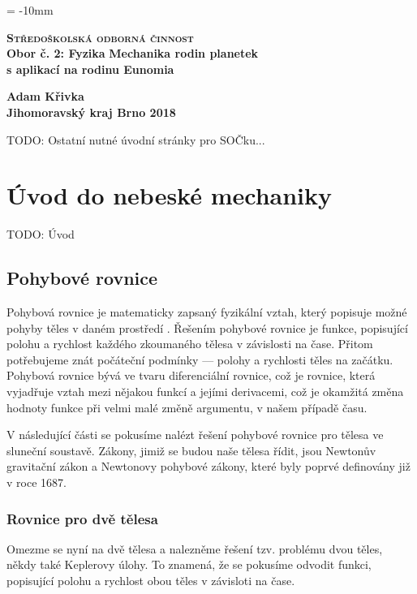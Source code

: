 \documentclass[A4paper, 12pt, oneside]{book}
\newcommand{\B}[1]{\textbf{#1}}
\renewcommand{\S}[1]{\textsc{#1}}
\begin{document}
\voffset = -10mm
\begin{center}
	{\LARGE \B{\S{Středoškolská odborná činnost}}} \\
	{\large \B{{Obor č. 2: Fyzika}}}
	\vfill
	{\Huge \B{Mechanika rodin planetek \\ s aplikací na rodinu Eunomia}}
\end{center}
	\vfill
{\large \bfseries Adam Křivka \\
	Jihomoravský kraj \hfill Brno 2018}

\newpage

TODO: Ostatní nutné úvodní stránky pro SOČku...

\newpage
\tableofcontents
\newpage

\chapter{Úvod do nebeské mechaniky}
TODO: Úvod
\vspace{40mm}
\section{Pohybové rovnice}
Pohybová rovnice je matematicky zapsaný fyzikální vztah, který popisuje možné pohyby těles v daném prostředí \autocite{wiki:eqm}. Řešením pohybové rovnice je funkce, popisující polohu a rychlost každého zkoumaného tělesa v závislosti na čase. Přitom potřebujeme znát počáteční podmínky --- polohy a rychlosti těles na začátku. Pohybová rovnice bývá ve tvaru diferenciální rovnice, což je rovnice, která vyjadřuje vztah mezi nějakou funkcí a jejími derivacemi, což je okamžitá změna hodnoty funkce při velmi malé změně argumentu, v našem případě času. 

V následující části se pokusíme nalézt řešení pohybové rovnice pro tělesa ve sluneční soustavě. Zákony, jimiž se budou naše tělesa řídit, jsou Newtonův gravitační zákon a Newtonovy pohybové zákony, které byly poprvé definovány již v roce 1687.
\subsection{Rovnice pro dvě tělesa}
Omezme se nyní na dvě tělesa a nalezněme řešení tzv. problému dvou těles, někdy také Keplerovy úlohy. To znamená, že se pokusíme odvodit funkci, popisující polohu a rychlost obou těles v závisloti na čase. 
\end{document}
